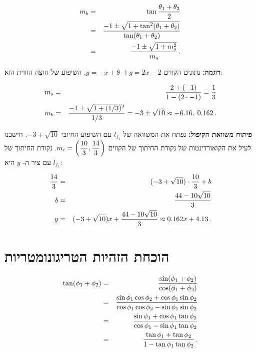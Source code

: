 \begin{eqnarray*}
m_b&=& \tan\displaystyle\frac{\theta_1+\theta_2}{2}\\
&=&\displaystyle\frac{-1\pm\sqrt{1+\tan^2(\theta_1+\theta_2)}}{\tan (\theta_1+\theta_2)}\\
&=&\displaystyle\frac{-1\pm\sqrt{1+m_s^2}}{m_s}\,.
\end{eqnarray*}



\textbf{דוגמה:}
נתונים הקווים
$y=2x-2$
ו-%
$y=-x+8$,
השיפוע של חוצה הזווית הוא:

\begin{eqnarray*}
m_s&=&\displaystyle\frac{2+(-1)}{1-(2 \cdot -1)}=\displaystyle\frac{1}{3}\\
m_b&=&\displaystyle\frac{-1\pm\sqrt{1+(1/3)^2}}{1/3}=-3\pm \sqrt{10}\approx -6.16,\; 0.162\,.
\end{eqnarray*}



\textbf{פיתוח משוואת הקיפול:}
נפתח את המשוואה של
$l_{f_1}$
עם השיפוע החיובי
$-3+ \sqrt{10}$.
חישבנו לעיל את הקואורדינטות של נקודת החיתוך של הקווים 
$m_i=\left(\displaystyle\frac{10}{3},\displaystyle\frac{14}{3}\right)$.
נקודת החיתוך של 
$l_{f_1}$
עם ציר ה-%
$y$
היא:

\begin{eqnarray*}
\displaystyle\frac{14}{3} &=& (-3+\sqrt{10}) \cdot \displaystyle\frac{10}{3} + b\\ b&=&\displaystyle\frac{44-10\sqrt{10}}{3}\\
y&=& (-3+\sqrt{10})x + \displaystyle\frac{44-10\sqrt{10}}{3}\approx 0.162x+4.13\,.
\end{eqnarray*}




\section{הוכחת הזהיות הטריגונומטריות}\label{s.tangent}




\begin{eqnarray*}
\tan (\phi_1+\phi_2) &=& \displaystyle\frac{\sin(\phi_1+\phi_2)}{\cos(\phi_1+\phi_2)}\\
&=&\displaystyle\frac{\sin\phi_1\cos\phi_2+\cos\phi_1\sin\phi_2}{\cos\phi_1\cos\phi_2-\sin\phi_1\sin\phi_2}\\
&=&\displaystyle\frac{\sin\phi_1+\cos\phi_1\tan\phi_2}{\cos\phi_1-\sin\phi_1\tan\phi_2}\\
&=&\displaystyle\frac{\tan\phi_1+\tan\phi_2}{1-\tan\phi_1\tan\phi_2}\,.
\end{eqnarray*}


